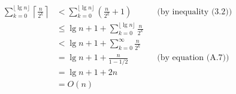 \setlength{\abovedisplayskip}{-\baselineskip}
\begin{align*}
	\sum_{k=0}^{\lfloor\lg n\rfloor}\left\lceil\frac{n}{2^k}\right\rceil &< \sum_{k=0}^{\lfloor\lg n\rfloor}\left(\frac{n}{2^k}+1\right) && \text{(by inequality (3.2))} \\
    &\le \lg n+1+\sum_{k=0}^{\lfloor\lg n\rfloor}\frac{n}{2^k} \\
    &< \lg n+1+\sum_{k=0}^\infty\frac{n}{2^k} \\
	&= \lg n+1+\frac{n}{1-1/2} && \text{(by equation (A.7))} \\
    &= \lg n+1+2n \\
    &= O(n)
\end{align*}
